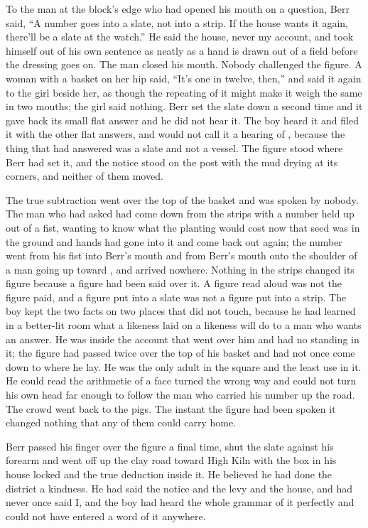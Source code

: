 To the man at the block's edge who had opened his mouth on a question, Berr said, “A number goes into a slate, not into a strip. If the house wants it again, there'll be a slate at the watch.” He said the house, never my account, and took himself out of his own sentence as neatly as a hand is drawn out of a field before the dressing goes on. The man closed his mouth. Nobody challenged the figure. A woman with a basket on her hip said, “It's one in twelve, then,” and said it again to the girl beside her, as though the repeating of it might make it weigh the same in two mouths; the girl said nothing. Berr set the slate down a second time and it gave back its small flat answer and he did not hear it. The boy heard it and filed it with the other flat answers, and would not call it a hearing of , because the thing that had answered was a slate and not a vessel. The figure stood where Berr had set it, and the notice stood on the post with the mud drying at its corners, and neither of them moved.

The true subtraction went over the top of the basket and was spoken by nobody. The man who had asked had come down from the strips with a number held up out of a fist, wanting to know what the planting would cost now that seed was in the ground and hands had gone into it and come back out again; the number went from his fist into Berr's mouth and from Berr's mouth onto the shoulder of a man going up toward , and arrived nowhere. Nothing in the strips changed its figure because a figure had been said over it. A figure read aloud was not the figure paid, and a figure put into a slate was not a figure put into a strip. The boy kept the two facts on two places that did not touch, because he had learned in a better-lit room what a likeness laid on a likeness will do to a man who wants an answer. He was inside the account that went over him and had no standing in it; the figure had passed twice over the top of his basket and had not once come down to where he lay. He was the only adult in the square and the least use in it. He could read the arithmetic of a face turned the wrong way and could not turn his own head far enough to follow the man who carried his number up the road. The crowd went back to the pigs. The instant the figure had been spoken it changed nothing that any of them could carry home.

Berr passed his finger over the figure a final time, shut the slate against his forearm and went off up the clay road toward High Kiln with the box in his house locked and the true deduction inside it. He believed he had done the district a kindness. He had said the notice and the levy and the house, and had never once said I, and the boy had heard the whole grammar of it perfectly and could not have entered a word of it anywhere.

